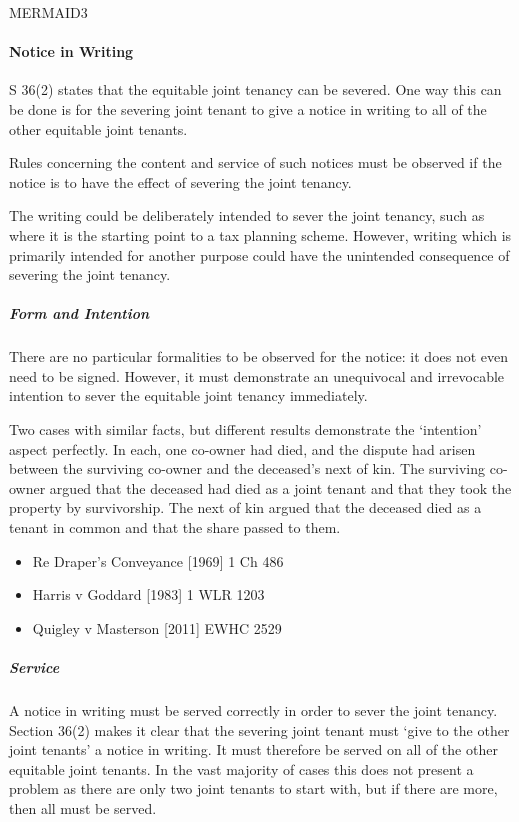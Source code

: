 \documentclass[
]{article}
\providecommand{\tightlist}{%
  \setlength{\itemsep}{0pt}\setlength{\parskip}{0pt}}
\begin{document}
MERMAID3

\hypertarget{notice-in-writing}{%
\paragraph{Notice in Writing}\label{notice-in-writing}}

S 36(2) states that the equitable joint tenancy can be severed. One way
this can be done is for the severing joint tenant to give a notice in
writing to all of the other equitable joint tenants.

Rules concerning the content and service of such notices must be
observed if the notice is to have the effect of severing the joint
tenancy.

The writing could be deliberately intended to sever the joint tenancy,
such as where it is the starting point to a tax planning scheme.
However, writing which is primarily intended for another purpose could
have the unintended consequence of severing the joint tenancy.

\hypertarget{form-and-intention}{%
\subparagraph{Form and Intention}\label{form-and-intention}}

There are no particular formalities to be observed for the notice: it
does not even need to be signed. However, it must demonstrate an
unequivocal and irrevocable intention to sever the equitable joint
tenancy immediately.

Two cases with similar facts, but different results demonstrate the
`intention' aspect perfectly. In each, one co-owner had died, and the
dispute had arisen between the surviving co-owner and the deceased's
next of kin. The surviving co-owner argued that the deceased had died as
a joint tenant and that they took the property by survivorship. The next
of kin argued that the deceased died as a tenant in common and that the
share passed to them.

\begin{itemize}
\tightlist
\item
  Re Draper's Conveyance {[}1969{]} 1 Ch 486
\item
  Harris v Goddard {[}1983{]} 1 WLR 1203
\item
  Quigley v Masterson {[}2011{]} EWHC 2529
\end{itemize}

\hypertarget{service}{%
\subparagraph{Service}\label{service}}

A notice in writing must be served correctly in order to sever the joint
tenancy. Section 36(2) makes it clear that the severing joint tenant
must `give to the other joint tenants' a notice in writing. It must
therefore be served on all of the other equitable joint tenants. In the
vast majority of cases this does not present a problem as there are only
two joint tenants to start with, but if there are more, then all must be
served.
\end{document}
